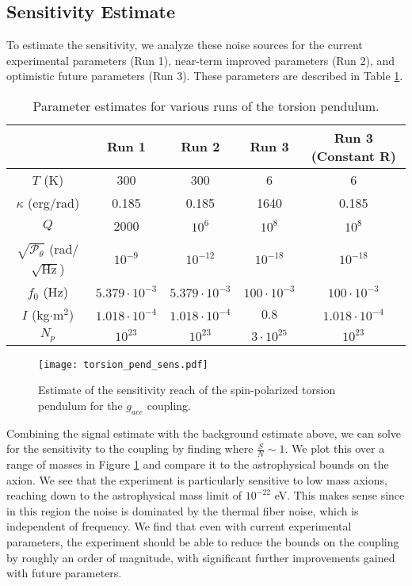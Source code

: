 \documentclass[aps,prd,final,letterpaper]{revtex4}
\begin{document}
\subsection{Sensitivity Estimate}

To estimate the sensitivity, we analyze these noise sources for the current experimental parameters (Run 1), near-term improved parameters (Run 2), and optimistic future parameters (Run 3). These parameters are described in Table \ref{parameter_table}. 

\begin{table}
\begin{center}
 \begin{tabular}{|c || c | c | c | c |} 
 \hline
  & Run 1 & Run 2 & Run 3 & Run 3 (Constant R)\\
 \hline\hline
 $T$ (K) & 300 & 300 & 6 & 6 \\ 
 \hline
 $\kappa$ (erg/rad) & 0.185 & 0.185 & 1640 & 0.185 \\
 \hline
 $Q$ & 2000 & $10^6$ & $10^8$ & $10^8$\\
 \hline
 $\sqrt{\mathcal{P}_{\theta}}$ (rad/$\sqrt{\mathrm{Hz}}$) & $10^{-9}$ & $10^{-12}$ & $10^{-18}$ & $10^{-18}$\\ 
 \hline
 $f_0$ (Hz) & $5.379 \cdot 10^{-3}$ & $5.379 \cdot 10^{-3}$ & $100 \cdot 10^{-3}$ & $100 \cdot 10^{-3}$\\
 \hline
 $I$ (kg$\cdot$m$^2$) & $1.018 \cdot 10^{-4}$ & $1.018 \cdot 10^{-4}$ & $0.8$ & $ 1.018 \cdot 10^{-4}$\\
 \hline
 $N_p$ & $10^{23}$ & $10^{23}$ & $3\cdot10^{25}$ & $10^{23}$\\
 \hline
\end{tabular}
\caption{Parameter estimates for various runs of the torsion pendulum.}
\label{parameter_table}
\end{center}
\end{table}

\begin{figure}
\texttt{[image: torsion\_pend\_sens.pdf]}
\caption{Estimate of the sensitivity reach of the spin-polarized torsion pendulum for the $g_{aee}$ coupling.}
\label{pend_sens_est}
\end{figure}


Combining the signal estimate with the background estimate above, we can solve for the sensitivity to the coupling by finding where $\frac{S}{N} \sim 1$. We plot this over a range of masses in Figure \ref{pend_sens_est} and compare it to the astrophysical bounds on the axion. We see that the experiment is particularly sensitive to low mass axions, reaching down to the astrophysical mass limit of $10^{-22}$ eV. This makes sense since in this region the noise is dominated by the thermal fiber noise, which is independent of frequency. We find that even with current experimental parameters, the experiment should be able to reduce the bounds on the coupling by roughly an order of magnitude, with significant further improvements gained with future parameters. 
\end{document}

